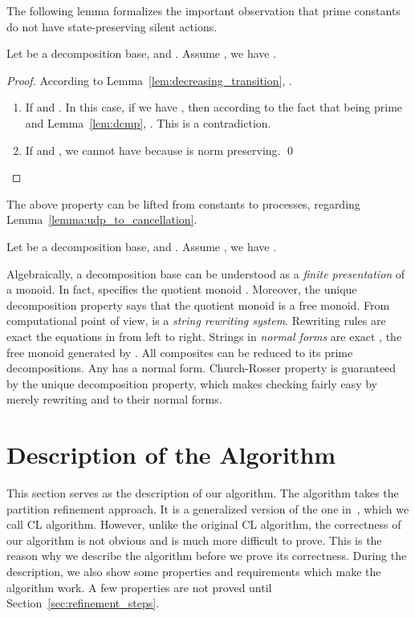 \documentclass{llncs}
\begin{document}
The following lemma formalizes the important observation that prime constants  do not have state-preserving silent actions.
\begin{lemma}\label{lem:tau_prime}
Let  be a decomposition base, and . Assume , we have .
\end{lemma}
\begin{proof}
According to Lemma~\ref{lem:decreasing_transition}, .

\begin{enumerate}
\item
If  and .  In this case, if we have , then according to the fact that  being prime and Lemma~\ref{lem:dcmp},  . This is a contradiction.

\item
If  and , we cannot have  because  is norm preserving.  \qed
\end{enumerate}



\end{proof}
The above property can be lifted from constants to processes, regarding Lemma~\ref{lemma:udp_to_cancellation}.
\begin{lemma}\label{lem:tau_prime_string}
Let  be a decomposition base, and . Assume , we have .
\end{lemma}

\begin{remark}
Algebraically, a decomposition base  can be understood as a {\em finite presentation} of a monoid. In fact,  specifies the quotient monoid . Moreover,  the unique decomposition property says that the quotient monoid  is a free monoid.
From computational point of view,  is a {\em string rewriting system}. Rewriting rules are exact the equations in  from left to right.  Strings in {\em normal forms} are exact , the free monoid generated by .  All composites can be reduced to its prime decompositions. Any  has a normal form.  Church-Rosser property is guaranteed by the unique decomposition property, which makes checking  fairly easy by merely rewriting  and  to their normal forms.
\end{remark}


\section{Description of the Algorithm}\label{sec:naive-algorithm}
This section serves as the description of our algorithm.
The algorithm takes the partition refinement approach.  It is a generalized version of the one in~\cite{DBLP:conf/fsttcs/CzerwinskiL10}, which we call CL algorithm. However, unlike the original CL algorithm, the correctness of our algorithm is not obvious and is much more difficult to prove.  This is the reason why we describe the algorithm  before we prove its correctness.  During the description, we also show some properties and requirements which make the algorithm work. A few properties are not proved until Section~\ref{sec:refinement_steps}.
\end{document}
